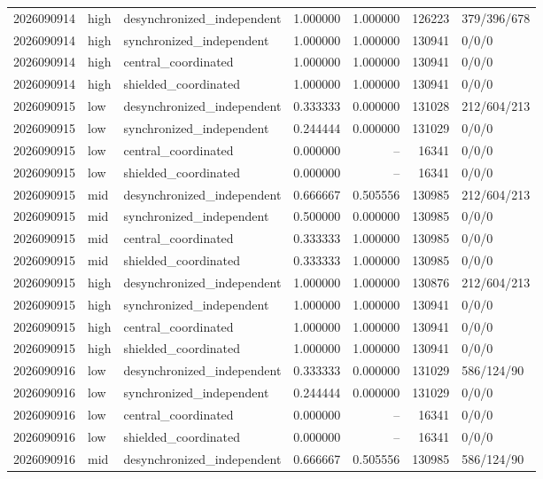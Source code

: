 \begin{longtable}{llp{38mm}rrrp{30mm}}
2026090914 & high & desynchronized\_independent & 1.000000 & 1.000000 & 126223 & 379/396/678 \\
2026090914 & high & synchronized\_independent & 1.000000 & 1.000000 & 130941 & 0/0/0 \\
2026090914 & high & central\_coordinated & 1.000000 & 1.000000 & 130941 & 0/0/0 \\
2026090914 & high & shielded\_coordinated & 1.000000 & 1.000000 & 130941 & 0/0/0 \\
2026090915 & low & desynchronized\_independent & 0.333333 & 0.000000 & 131028 & 212/604/213 \\
2026090915 & low & synchronized\_independent & 0.244444 & 0.000000 & 131029 & 0/0/0 \\
2026090915 & low & central\_coordinated & 0.000000 & -- & 16341 & 0/0/0 \\
2026090915 & low & shielded\_coordinated & 0.000000 & -- & 16341 & 0/0/0 \\
2026090915 & mid & desynchronized\_independent & 0.666667 & 0.505556 & 130985 & 212/604/213 \\
2026090915 & mid & synchronized\_independent & 0.500000 & 0.000000 & 130985 & 0/0/0 \\
2026090915 & mid & central\_coordinated & 0.333333 & 1.000000 & 130985 & 0/0/0 \\
2026090915 & mid & shielded\_coordinated & 0.333333 & 1.000000 & 130985 & 0/0/0 \\
2026090915 & high & desynchronized\_independent & 1.000000 & 1.000000 & 130876 & 212/604/213 \\
2026090915 & high & synchronized\_independent & 1.000000 & 1.000000 & 130941 & 0/0/0 \\
2026090915 & high & central\_coordinated & 1.000000 & 1.000000 & 130941 & 0/0/0 \\
2026090915 & high & shielded\_coordinated & 1.000000 & 1.000000 & 130941 & 0/0/0 \\
2026090916 & low & desynchronized\_independent & 0.333333 & 0.000000 & 131029 & 586/124/90 \\
2026090916 & low & synchronized\_independent & 0.244444 & 0.000000 & 131029 & 0/0/0 \\
2026090916 & low & central\_coordinated & 0.000000 & -- & 16341 & 0/0/0 \\
2026090916 & low & shielded\_coordinated & 0.000000 & -- & 16341 & 0/0/0 \\
2026090916 & mid & desynchronized\_independent & 0.666667 & 0.505556 & 130985 & 586/124/90 \\

\end{longtable}
